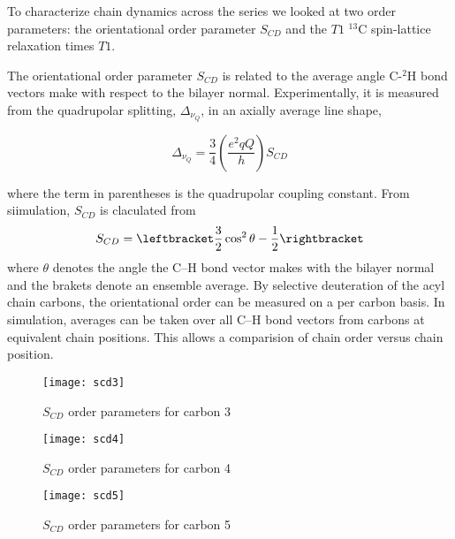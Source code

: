 \documentclass[doublespacing]{elsart}
\begin{document}
To characterize chain dynamics across the series we looked at two order parameters:
the orientational order parameter $S_{CD}$ and the $T1$ $^13$C spin-lattice relaxation times $T1$.

The orientational order parameter $S_{CD}$ is related to the average angle C-$^2$H bond 
vectors make with respect to the bilayer normal. Experimentally, it is measured from the 
quadrupolar splitting, $\Delta_{\nu_{Q}}$, in an axially average line shape,

\begin{equation}
\Delta_{\nu_{Q}} = \frac{3}{4}(\frac{e^2qQ}{h})S_{CD}
\end{equation}

where the term in parentheses is the quadrupolar coupling constant. From siimulation, $S_{CD}$
is claculated from 
\begin{equation}
S_{CD} = \leftbracket \frac{3}{2}\cos^2\theta - \frac{1}{2} \rightbracket
\end{equation} 
where $\theta$ denotes the angle the C--H bond vector makes with the bilayer normal and the brakets 
denote an ensemble average. By selective deuteration of the acyl chain carbons, the orientational 
order can be measured on a per carbon basis. In simulation, averages can be taken over all C--H 
bond vectors from carbons at equivalent chain positions. This allows a comparision of chain order 
versus chain position.

\begin{figure}[p]
\begin{center}
\texttt{[image: scd3]}
\end{center}
\caption{$S_{CD}$ order parameters for carbon 3}
\label{fig:scd3}
\end{figure}

\begin{figure}[p]
\begin{center}
\texttt{[image: scd4]}
\end{center}
\caption{$S_{CD}$ order parameters for carbon 4}
\label{fig:scd4}
\end{figure}

\begin{figure}[p]
\begin{center}
\texttt{[image: scd5]}
\end{center}
\caption{$S_{CD}$ order parameters for carbon 5}
\label{fig:scd5}
\end{figure}
\end{document}

